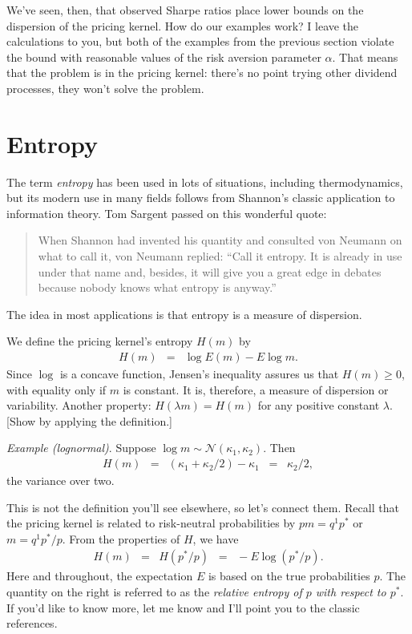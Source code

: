 \documentclass[11pt]{article}
\begin{document}
We've seen, then, that observed Sharpe ratios place lower bounds
on the dispersion of the pricing kernel.
How do our examples work?
I leave the calculations to you, but both of the examples from the previous
section violate the bound with reasonable values of the risk
aversion parameter $\alpha$.
That means that the problem is in the pricing kernel:
there's no point trying other dividend processes,
they won't solve the problem.


\section{Entropy}

The term {\it entropy\/} has been used in lots of situations, including thermodynamics,
but its modern use in many fields follows from Shannon's
classic application to information theory.
Tom Sargent passed on this wonderful quote:
%
\begin{quote}
When Shannon had invented his quantity and consulted
von Neumann on what to call it, von Neumann replied:
``Call it entropy. It is already in use under that name and,
besides, it will give you a great edge in debates because
nobody knows what entropy is anyway.''
\end{quote}
%
The idea in most applications is that entropy is a measure of dispersion.

We define the pricing kernel's entropy $H(m)$ by
\begin{eqnarray*}
    H(m) &=& \log E(m) - E \log m .
\end{eqnarray*}
Since $\log$ is a concave function,
Jensen's inequality assures us that $H(m) \geq 0$,
with equality only if $m$ is constant.
It is, therefore, a measure of dispersion or variability.
Another property:
$H(\lambda m) = H(m)$ for any positive constant $\lambda$.
[Show by applying the definition.]

{\it Example (lognormal)\/}.
Suppose $ \log m \sim \mathcal{N}(\kappa_1,\kappa_2)$.
Then
\begin{eqnarray*}
    H(m) &=& (\kappa_1 + \kappa_2/2) - \kappa_1
            \;\;=\;\; \kappa_2/2 ,
\end{eqnarray*}
the variance over two.

This is not the definition you'll see elsewhere, so let's connect them.
Recall that the pricing kernel is related to risk-neutral
probabilities by $ p m = q^1 p^* $ or $ m = q^1 p^*/p $.
From the properties of $H$, we have
\begin{eqnarray*}
        H(m) &=& H (p^*/p) \;\;=\;\; - E \log (p^*/p) .
\end{eqnarray*}
Here and throughout, the expectation $E$ is based on the true probabilities $p$.
The quantity on the right is referred to as the
{\it relative entropy of $p$ with respect to $p^*$\/}.
If you'd like to know more, let me know and I'll point you to the classic
references.
\end{document}

